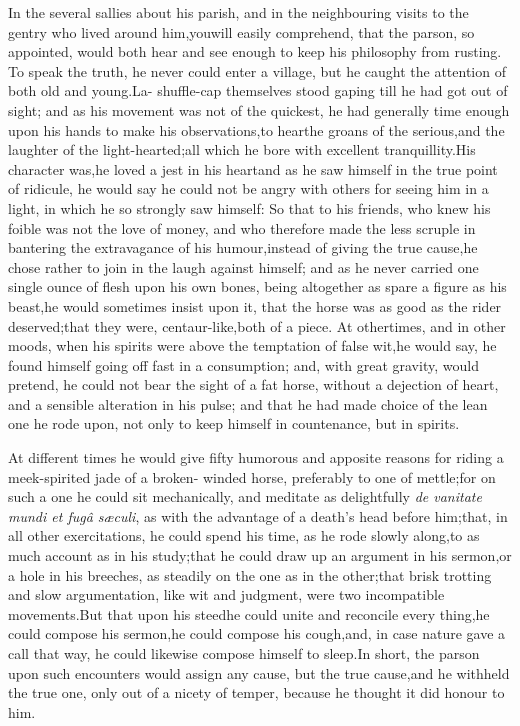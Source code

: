 \documentclass{article}
\begin{document}
In the several sallies about his parish, 
and in the neighbouring visits to the\break
gentry who lived around him,\tsh  you\break will easily
comprehend, that the parson, so appointed, would both hear and see
enough to keep his philosophy from\break
rusting. To speak the truth, he never
could enter a village, but he caught the attention
of both old and young.\tsh  La-\break
{}
\break shuffle-cap themselves
stood gaping till he had got out of sight; and as his\break
movement was
not of the quickest, he had generally time enough upon his\break
hands to make his observations,\tsk  to hear\pb the groans of the
serious,\tsh and the laughter of the light-hearted;\tsk all which he
bore with excellent tranquillity.\tsk  His character was,\tsk  he
loved a jest in his heart\tsk  and as he saw himself in the true
point of ridicule, he would say he could not be angry with others
for seeing him in a light, in which he so strongly saw himself: So
that to his friends, who knew his foible was not the love of money,
and who therefore made the less scruple in bantering the
extravagance of his humour,\tsk  instead of giving the true
cause,\tsk  he chose rather to join in the laugh against himself;
and as he never carried one single ounce of flesh upon his own bones, being altogether
as spare a figure as his beast,\tsk  he would sometimes insist
upon it, that the horse was as good as the rider
deserved;\tsk  that they were, centaur-like,\tsk  both of a
piece. At other\pb times, and in other moods, when his spirits were
above the temptation of false wit,\tsk  he would say, he found
himself going off fast in a consumption; and, with great gravity,
would pretend, he could not bear the sight of a fat horse, without
a dejection of heart, and a sensible alteration in his pulse; and
that he had made choice of the lean one he rode upon, not only to
keep himself in countenance, but in spirits.

At different times he would give fifty humorous and apposite
reasons for riding a meek-spirited jade of a broken-\break 
winded horse,
preferably to one of mettle;\tsk  for on such a one he could sit
mechanically, and meditate as delightfully \textit{de vanitate mundi et
fugâ sæculi}, as with the advantage of a
death’s head before him;\tsk  that, in all other
exercitations, he\pb
could spend his time, as he rode slowly along,\tsk  to as
much account as in his study;\tsk  that he could draw up an
argument in his sermon,\tsk  or a hole in his breeches, as
steadily on the one as in the other;\tsk  that brisk trotting and
slow argumentation, like wit and judgment, were two incompatible
movements.\tsk  But that upon his steed\tsk  he could unite and
reconcile every thing,\tsk  he could compose his sermon,\tsk  he
could compose his cough,\tsh  and, in case nature gave a
call that way, he could likewise compose himself to sleep.\tsk  In
short, the parson upon such encounters would assign any cause, but
the true cause,\tsk  and he with\-held the true one, only out of a
nicety of temper, because he thought it did honour to him.
\end{document}

